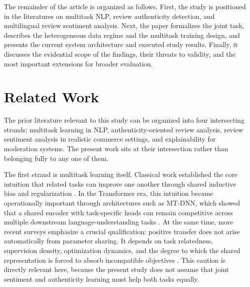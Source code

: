 \documentclass[12pt,a4paper]{article}
\begin{document}
The remainder of the article is organized as follows. First, the study is positioned in the literatures on multitask NLP, review authenticity detection, and multilingual review sentiment analysis. Next, the paper formalizes the joint task, describes the heterogeneous data regime and the multitask training design, and presents the current system architecture and executed study results. Finally, it discusses the evidential scope of the findings, their threats to validity, and the most important extensions for broader evaluation.

\section{Related Work}

The prior literature relevant to this study can be organized into four intersecting strands: multitask learning in NLP, authenticity-oriented review analysis, review sentiment analysis in realistic commerce settings, and explainability for moderation systems. The present work sits at their intersection rather than belonging fully to any one of them.

The first strand is multitask learning itself. Classical work established the core intuition that related tasks can improve one another through shared inductive bias and regularization \cite{caruana1997}. In the Transformer era, this intuition became operationally important through architectures such as MT-DNN, which showed that a shared encoder with task-specific heads can remain competitive across multiple downstream language-understanding tasks \cite{liu2019}. At the same time, more recent surveys emphasize a crucial qualification: positive transfer does not arise automatically from parameter sharing. It depends on task relatedness, supervision density, optimization dynamics, and the degree to which the shared representation is forced to absorb incompatible objectives \cite{zhang2023}. This caution is directly relevant here, because the present study does not assume that joint sentiment and authenticity learning must help both tasks equally.
\end{document}
